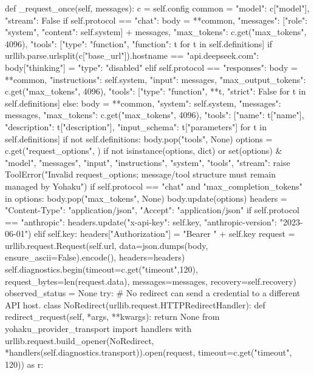     def _request_once(self, messages):
        c = self.config
        common = {"model": c["model"], "stream": False}
        if self.protocol == "chat":
            body = {**common, "messages": [{"role": "system", "content": self.system}] + messages,
                "max_tokens": c.get("max_tokens", 4096), "tools": [{"type": "function", "function": t} for t in self.definitions]}
            if urllib.parse.urlsplit(c["base_url"]).hostname == "api.deepseek.com":
                body["thinking"] = {"type": "disabled"}
        elif self.protocol == "responses":
            body = {**common, "instructions": self.system, "input": messages,
                "max_output_tokens": c.get("max_tokens", 4096),
                "tools": [{"type": "function", **t, "strict": False} for t in self.definitions]}
        else:
            body = {**common, "system": self.system, "messages": messages, "max_tokens": c.get("max_tokens", 4096),
                "tools": [{"name": t["name"], "description": t["description"], "input_schema": t["parameters"]} for t in self.definitions]}
        if not self.definitions:
            body.pop("tools", None)
        options = c.get("request_options", {})
        if not isinstance(options, dict) or set(options) & {"model", "messages", "input", "instructions", "system", "tools", "stream"}:
            raise ToolError("Invalid request_options; message/tool structure must remain managed by Yohaku")
        if self.protocol == "chat" and "max_completion_tokens" in options:
            body.pop("max_tokens", None)
        body.update(options)
        headers = {"Content-Type": "application/json", "Accept": "application/json"}
        if self.protocol == "anthropic":
            headers.update({"x-api-key": self.key, "anthropic-version": "2023-06-01"})
        elif self.key:
            headers["Authorization"] = "Bearer " + self.key
        request = urllib.request.Request(self.url, data=json.dumps(body, ensure_ascii=False).encode(), headers=headers)
        self.diagnostics.begin(timeout=c.get("timeout",120), request_bytes=len(request.data), messages=messages, recovery=self.recovery)
        observed_status = None
        try:
            # No redirect can send a credential to a different API host.
            class NoRedirect(urllib.request.HTTPRedirectHandler):
                def redirect_request(self, *args, **kwargs):
                    return None
            from yohaku_provider_transport import handlers
            with urllib.request.build_opener(NoRedirect, *handlers(self.diagnostics.transport)).open(request, timeout=c.get("timeout", 120)) as r:
